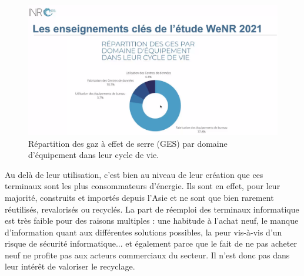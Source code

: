 \documentclass[a4paper,12pt,twoside]{book}
\begin{document}
\begin{figure}[H]
    \centering
    \includegraphics[width=12cm]{img/partie_3/GES.png}
    \caption[Répartition des gaz à effet de serre (GES) par domaine d'équipement dans leur cycle de vie]{Répartition des gaz à effet de serre (GES) par domaine d'équipement dans leur cycle de vie.\footnotemark}
\end{figure}


Au delà de leur utilisation, c'est bien au niveau de leur création que ces terminaux sont les plus consommateurs d'énergie. Ils sont en effet, pour leur majorité, construits et importés depuis l'Asie et ne sont que bien rarement réutilisés, revalorisés ou recyclés. La part de réemploi des terminaux informatique est très faible pour des raisons multiples : une habitude à l'achat neuf, le manque d'information quant aux différentes solutions possibles, la peur vis-à-vis d'un risque de sécurité informatique... et également parce que le fait de ne pas acheter neuf ne profite pas aux acteurs commerciaux du secteur. Il n'est donc pas dans leur intérêt de valoriser le recyclage.
\end{document}
